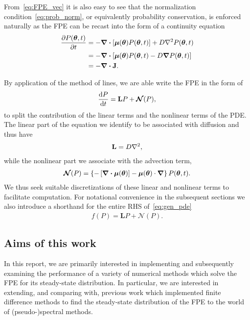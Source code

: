 \documentclass[11pt]{article}
\newcommand{\mN}{\bm{\mathcal{N}}}
\begin{document}
From~\eqref{eq:FPE_vec} it is also easy to see that the normalization condition~\eqref{eq:prob_norm}, or equivalently probability conservation, is enforced naturally as the FPE can be recast into the form of a continuity equation
\begin{subequations}
    \label{eq:continuity}
    \begin{align}
        \pdv{P(\bm{\theta}, t)}{t} &= -\div{\left[\bm{\mu}(\bm{\theta})P(\bm{\theta},t)\right]} + D\laplacian{P(\bm{\theta},t)} \\
        &= -\div{\left[\bm{\mu}(\bm{\theta})P(\bm{\theta},t) - D\grad{P(\bm{\theta},t)}\right]}\\
        &= -\div{\vb{J}}.
    \end{align}
\end{subequations}


By application of the method of lines, we are able write the FPE in the form of
\begin{align}
    \dv{P}{t} = \mathbf{L}P + \mN(P),\label{eq:gen_pde}
\end{align}
to split the contribution of the linear terms and the nonlinear terms of the PDE. The linear part of the equation we identify to be associated with diffusion and thus have 
\begin{align}
    \mathbf{L} = D\laplacian,\label{eq:linear}
\end{align}
while the nonlinear part we associate with the advection term,
\begin{align}
    \mN(P) = \left\{-\left[\div{\bm{\mu}(\bm{\theta})}\right] - \bm{\mu}(\bm{\theta})\cdot\grad\right\}{P(\bm{\theta},t)}.\label{eq:nonlinear}
\end{align}
We thus seek suitable discretizations of these linear and nonlinear terms to facilitate computation. For notational convenience in the subsequent sections we also introduce a shorthand for the entire RHS of~\eqref{eq:gen_pde}
\begin{align}
    f(P) = \mathbf{L}P+ \mN(P).\label{eq:frhs}
\end{align}

\subsection{Aims of this work}

In this report, we are primarily interested in implementing and subsequently examining the performance of a variety of numerical methods which solve the FPE for its steady-state distribution. In particular, we are interested in extending, and comparing with, previous work which implemented finite difference methods to find the steady-state distribution of the FPE to the world of (pseudo-)spectral methods. 
\end{document}
